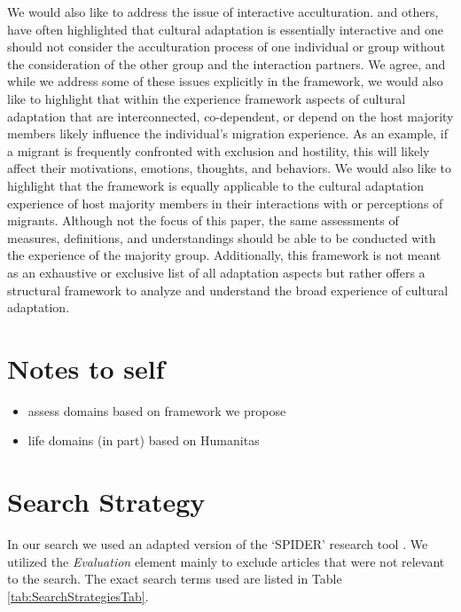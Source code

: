 \documentclass[man, 12pt, a4paper]{apa7}
\begin{document}
We would also like to address the issue of interactive acculturation. \citet{Bourhis1997a} and others, have often highlighted that cultural adaptation is essentially interactive and one should not consider the acculturation process of one individual or group without the consideration of the other group and the interaction partners. We agree, and while we address some of these issues explicitly in the framework, we would also like to highlight that within the experience framework aspects of cultural adaptation that are interconnected, co-dependent, or depend on the host majority members likely influence the individual's migration experience. As an example, if a migrant is frequently confronted with exclusion and hostility, this will likely affect their motivations, emotions, thoughts, and behaviors. 
We would also like to highlight that the framework is equally applicable to the cultural adaptation experience of host majority members in their interactions with or perceptions of migrants. Although not the focus of this paper, the same assessments of measures, definitions, and understandings should be able to be conducted with the experience of the majority group.
Additionally, this framework is not meant as an exhaustive or exclusive list of all adaptation aspects but rather offers a structural framework to analyze and understand the broad experience of cultural adaptation.

\section{Notes to self}
\begin{itemize}
  \item assess domains based on framework we propose
  \item life domains (in part) based on Humanitas
\end{itemize}

\printbibliography

\appendix

\section{Search Strategy}
\label{app:AppendixSearchStrategy}

In our search we used an adapted version of the `SPIDER' research tool \citep[e.g.,][]{Cooke2012}. We utilized the \textit{Evaluation} element mainly to exclude articles that were not relevant to the search. The exact search terms used are listed in Table \ref{tab:SearchStrategiesTab}.


\end{document}

